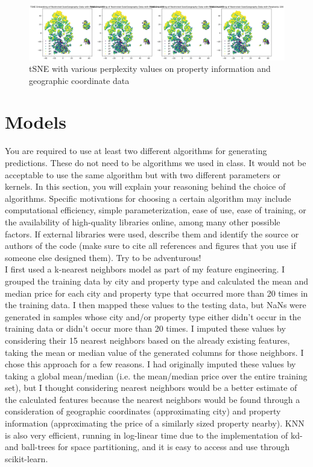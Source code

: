 \documentclass[12pt]{article}
\newtheorem{Proof of Lemma}{Proof of Lemma}
\begin{document}
\begin{figure}[H]
	\begin{center}
		\includegraphics*[width=\textwidth]{../figures/tsne_restricted_geo.png}
		\caption*{tSNE with various perplexity values on property information and geographic coordinate data}
	\end{center}
\end{figure}

\section{Models}
You are required to use at least two different algorithms for generating predictions. These do not need to be algorithms we used in class. It would not be acceptable to use the same algorithm but with two different parameters or kernels. In this section, you will explain your reasoning behind the choice of algorithms. Specific motivations for choosing a certain algorithm may include computational efficiency, simple parameterization, ease of use, ease of training, or the availability of high-quality libraries online, among many other possible factors. If external libraries were used, describe them and identify the source or authors of the code (make sure to cite all references and figures that you use if someone else designed them). Try to be adventurous! \\

I first used a k-nearest neighbors model as part of my feature engineering. I grouped the training data by city and property type and calculated the mean and median price for each city and property type that occurred more than 20 times in the training data. I then mapped these values to the testing data, but NaNs were generated in samples whose city and/or property type either didn't occur in the training data or didn't occur more than 20 times. I imputed these values by considering their 15 nearest neighbors based on the already existing features, taking the mean or median value of the generated columns for those neighbors. I chose this approach for a few reasons. I had originally imputed these values by taking a global mean/median (i.e. the mean/median price over the entire training set), but I thought considering nearest neighbors would be a better estimate of the calculated features because the nearest neighbors would be found through a consideration of geographic coordinates (approximating city) and property information (approximating the price of a similarly sized property nearby). KNN is also very efficient, running in log-linear time due to the implementation of kd- and ball-trees for space partitioning, and it is easy to access and use through scikit-learn. \\
\end{document}
